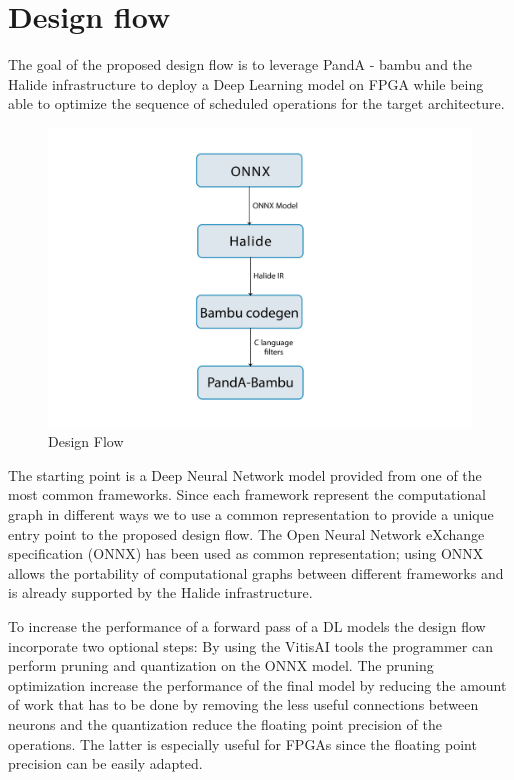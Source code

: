 \documentclass[../main.tex]{subfiles}
\begin{document}
\newpage

\section{Design flow}
\label {design-flow}
The goal of the proposed design flow is to leverage PandA - bambu and the Halide infrastructure to deploy a Deep Learning model on FPGA while being able to optimize the sequence of scheduled operations for the target architecture.


\begin{figure}[h!]
  \includegraphics[width=1\textwidth]{images/Stack.png}
  \centering
  \caption{Design Flow}
  \label{fig:DesignFlowStack}
\end{figure}

\bigskip
The starting point is a Deep Neural Network model provided from one of the most common frameworks. Since each framework represent the computational graph in different ways we to use a common representation to provide a unique entry point to the proposed design flow. The Open Neural Network eXchange specification (ONNX) has been used as common representation; using ONNX allows the portability of computational graphs between different frameworks and is already supported by the Halide infrastructure.

To increase the performance of a forward pass of a DL models the design flow incorporate two optional steps: By using the VitisAI tools the programmer can perform pruning and quantization on the ONNX model. The pruning optimization increase the performance of the final model by reducing the amount of work that has to be done by removing the less useful connections between neurons and the quantization reduce the floating point precision of the operations. The latter is especially useful for FPGAs since the floating point precision can be easily adapted. 
\end{document}
